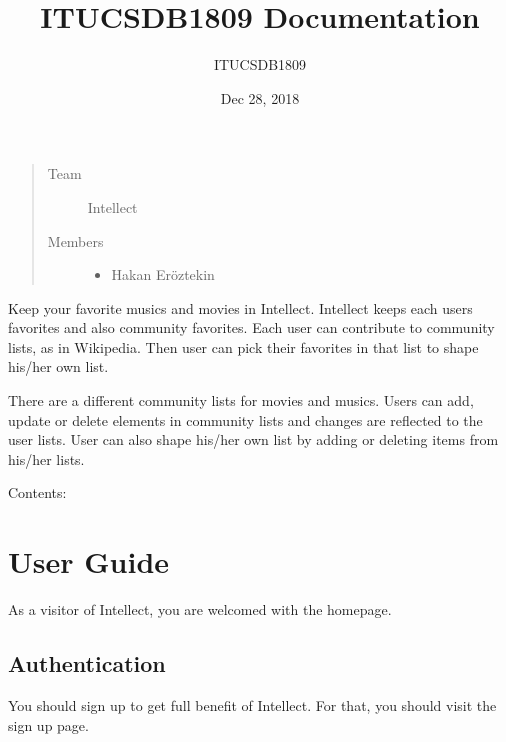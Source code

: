 \documentclass[letterpaper,10pt,english]{sphinxmanual}
\title{ITUCSDB1809 Documentation}
\date{Dec 28, 2018}
\author{ITUCSDB1809}
\begin{document}
\pagestyle{empty}
\sphinxmaketitle
\pagestyle{plain}
\sphinxtableofcontents
\pagestyle{normal}
\label{\detokenize{index::doc}}

\begin{quote}\begin{description}
\item[{Team}] \leavevmode
Intellect

\item[{Members}] \leavevmode\begin{itemize}
\item {} 
Hakan Eröztekin

\end{itemize}

\end{description}\end{quote}

Keep your favorite musics and movies in Intellect.
Intellect keeps each users favorites and also community favorites.
Each user can contribute to community lists, as in Wikipedia.
Then user can pick their favorites in that list to shape his/her own list.

There are a different community lists for movies and musics.
Users can add, update or delete elements in community lists and changes
are reflected to the user lists. User can also shape his/her own list by
adding or deleting items from his/her lists.

Contents:


\chapter{User Guide}
\label{\detokenize{user/index:user-guide}}\label{\detokenize{user/index::doc}}
As a visitor of Intellect, you are welcomed with the homepage.

\begin{figure}[htbp]
\centering

\noindent{}
\end{figure}


\section{Authentication}
\label{\detokenize{user/index:authentication}}
You should sign up to get full benefit of Intellect. For that, you should visit the sign up page.

\begin{figure}[htbp]
\centering

\noindent{}
\end{figure}
\end{document}
